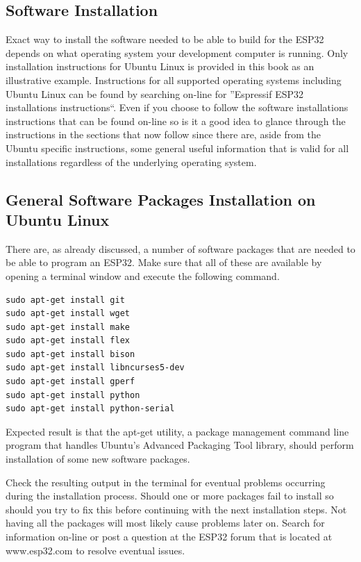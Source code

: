 \documentclass{tufte-book}
\begin{document}
\subsection{Software Installation}
Exact way to install the software needed to be able to build for the ESP32 depends on what operating system your development computer is running.
Only installation instructions for Ubuntu Linux is provided in this book as an illustrative example. Instructions for all supported operating systems including Ubuntu Linux can be found by searching on-line for ''Espressif ESP32 installations instructions``.
Even if you choose to follow the software installations instructions that can be found on-line so is it a good idea to glance through the instructions in the sections that now follow since there are, aside from the Ubuntu specific instructions, some general useful information that is valid for all installations regardless of the underlying operating system.

\subsection{General Software Packages Installation on Ubuntu Linux}
There are, as already discussed, a number of software packages that are needed to be able to program an ESP32. Make sure that all of these are available by opening a terminal window and execute the following command. 
	
\begin{lstlisting}
sudo apt-get install git
sudo apt-get install wget
sudo apt-get install make
sudo apt-get install flex
sudo apt-get install bison
sudo apt-get install libncurses5-dev
sudo apt-get install gperf
sudo apt-get install python
sudo apt-get install python-serial
\end{lstlisting}

Expected result is that the apt-get utility, a package management command line program that handles Ubuntu's Advanced Packaging Tool library, should perform installation of some new software packages.
 
Check the resulting output in the terminal for eventual problems occurring during the installation process. Should one or more packages fail to install so should you try to fix this before continuing with the next installation steps. Not having all the packages will most likely cause problems later on. Search for information on-line or post a question at the ESP32 forum that is located at www.esp32.com to resolve eventual issues.
\end{document}
